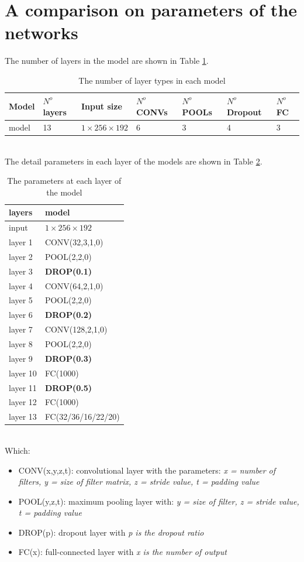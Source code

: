 \documentclass[12pt,a4paper]{article}
\begin{document}
\section{A comparison on parameters of the networks}
The number of layers in the model are shown in Table \ref{numlayers}.
\begin{table}[h!]
	\centering
	\begin{tabular}{l p{1.2cm} p{3cm} p{2cm} p{1.2cm} p{2cm} p{2cm}}
		Model & $N^o$ layers & Input size & $N^o$ CONVs & $N^o$ POOLs & $N^o$ Dropout & $N^o$ FC \\ \hline
		model & 13 & $1 \times 256 \times 192$ & 6 & 3 & 4 & 3 \\ \hline
	\end{tabular}
	\caption{The number of layer types in each model}
	\label{numlayers}
\end{table}~\\
The detail parameters in each layer of the models are shown in Table \ref{modelparameters}.
\begin{table}[h!]
	\centering
	\begin{tabular}{l p{3cm} }
		layers &  model  \\ \hline
		input & $1 \times 256 \times 192$ \\ \hline
 		layer 1 & CONV(32,3,1,0) \\ \hline
		layer 2 & POOL(2,2,0) \\ \hline
		layer 3 & \textbf{DROP(0.1)} \\ \hline
		layer 4 & CONV(64,2,1,0) \\ \hline
		layer 5 & POOL(2,2,0) \\ \hline
		layer 6 & \textbf{DROP(0.2)} \\ \hline
		layer 7 & CONV(128,2,1,0) \\ \hline
		layer 8 & POOL(2,2,0) \\ \hline
		layer 9 & \textbf{DROP(0.3)} \\ \hline
		layer 10 & FC(1000) \\ \hline
		layer 11 & \textbf{DROP(0.5)} \\ \hline
		layer 12& FC(1000) \\ \hline
		layer 13 & FC(32/36/16/22/20) \\ \hline
	\end{tabular}
	\caption{The parameters at each layer of the model}
	\label{modelparameters}
\end{table}~\\
Which:
\begin{itemize}
	\item CONV(x,y,z,t): convolutional layer with the parameters: \textit{x = number of filters, y = size of filter matrix, z = stride value, t = padding value}
	\item POOL(y,z,t): maximum pooling layer with: \textit{y = size of filter, z = stride value, t = padding value}
	\item DROP(p): dropout layer with \textit{p is the dropout ratio}
	\item FC(x): full-connected layer with \textit{x is the number of output}
\end{itemize}
\end{document}
